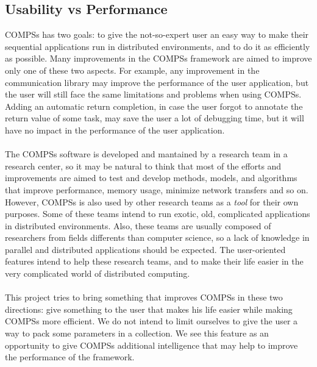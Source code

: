 \subsection{Usability vs Performance}
\label{subsec:compss_ux_vs_perf}
COMPSs has two goals: to give the not-so-expert user an easy way to make their sequential applications run in distributed environments, and to do it as efficiently as possible. Many improvements in the COMPSs framework are aimed to improve only one of these two aspects. For example, any improvement in the communication library may improve the performance of the user application, but the user will still face the same limitations and problems when using COMPSs. Adding an automatic return completion, in case the user forgot to annotate the return value of some task, may save the user a lot of debugging time, but it will have no impact in the performance of the user application.\\
\\
The COMPSs software is developed and mantained by a research team in a research center, so it may be natural to think that most of the efforts and improvements are aimed to test and develop methods, models, and algorithms that improve performance, memory usage, minimize network transfers and so on. However, COMPSs is also used by other research teams as a \textit{tool} for their own purposes. Some of these teams intend to run exotic, old, complicated applications in distributed environments. Also, these teams are usually composed of researchers from fields differents than computer science, so a lack of knowledge in parallel and distributed applications should be expected. The user-oriented features intend to help these research teams, and to make their life easier in the very complicated world of distributed computing.\\
\\
This project tries to bring something that improves COMPSs in these two directions: give something to the user that makes his life easier while making COMPSs more efficient. We do not intend to limit ourselves to give the user a way to pack some parameters in a collection. We see this feature as an opportunity to give COMPSs additional intelligence that may help to improve the performance of the framework.
